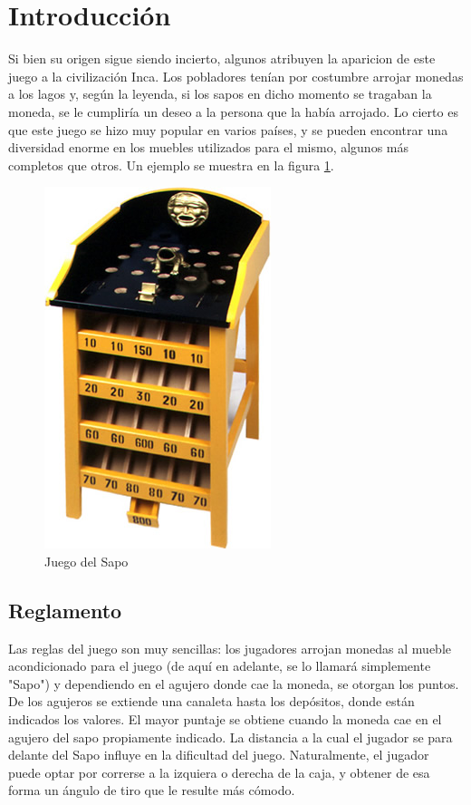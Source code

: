 \documentclass{acm_proc_article-sp}
\begin{document}

\section{Introducci\'on}
\label{sec:introduccion}

Si bien su origen sigue siendo incierto, algunos atribuyen la aparicion de este juego a la civilizaci\'on Inca. Los pobladores ten\'ian por costumbre arrojar monedas a los lagos y, seg\'un la leyenda, si los sapos en dicho momento se tragaban la moneda, se le cumplir\'ia un deseo a la persona que la hab\'ia arrojado.
Lo cierto es que este juego se hizo muy popular en varios pa\'ises, y se pueden encontrar una diversidad enorme en los muebles
utilizados para el mismo, algunos m\'as completos que otros. Un ejemplo se muestra en la figura \ref{fig:sapoReal}.


\begin{figure}[!ht]
	\centering
		\includegraphics[]{img/juegoSapo.jpg}
	\caption{Juego del Sapo}
	\label{fig:sapoReal}
\end{figure}


\subsection{Reglamento}
\label{subsec:reg}
Las reglas del juego son muy sencillas: los jugadores arrojan monedas al mueble acondicionado para el juego (de aqu\'i en adelante, se lo llamar\'a simplemente "Sapo") y dependiendo en el agujero donde cae la moneda, se otorgan los puntos. De los agujeros se extiende una canaleta hasta los dep\'ositos, donde est\'an indicados los valores. El mayor puntaje se obtiene cuando la moneda cae en el agujero del sapo propiamente indicado. 
La distancia a la cual el jugador se para delante del Sapo influye en la dificultad del juego. Naturalmente, el jugador puede optar por correrse a la izquiera o derecha de la caja, y obtener de esa forma un \'angulo de tiro que le resulte m\'as c\'omodo.
\end{document}
